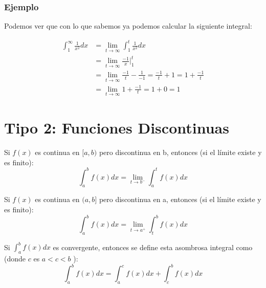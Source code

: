 \documentclass[12pt, fleqn]{report}                             %
\theoremstyle{break}                                            %
\begin{document}
            \subsubsection{Ejemplo}
            Podemos ver que con lo que sabemos ya podemos calcular la siguiente integral:

            \begin{equation*}
            \begin{split}
                \int_1^{\infty} \frac{1}{x^2} dx & = \lim_{t \to \infty} \int_1^t \frac{1}{x^2} dx \\
                & = \lim_{t \to \infty} \frac{-1}{x} \big\rvert_{1}^{t} \\
                & = \lim_{t \to \infty} \frac{-1}{t} - \frac{1}{-1} = \frac{-1}{t} + 1 = 1 + \frac{-1}{t} \\
                & = \lim_{t \to \infty} 1 + \frac{-1}{t} = 1 + 0 = 1
            \end{split}
            \end{equation*}

            \clearpage

        \clearpage
        \section{Tipo 2: Funciones Discontinuas}

            Si $f(x)$ es continua en $[a, b)$  pero discontinua en b, entonces
            (si el límite existe y es finito):
            \begin{equation}
                \int_a^b f(x) dx = \lim_{t \to b^-} \int_a^t f(x) dx
            \end{equation}

            Si $f(x)$ es continua en $(a, b]$  pero discontinua en a, entonces
            (si el límite existe y es finito):
            \begin{equation}
                \int_a^b f(x) dx = \lim_{t \to a^+} \int_t^b f(x) dx
            \end{equation}



            Si $\int_a^bf(x)dx$ es convergente, entonces se define esta asombrosa integral
            como (donde $c$ es $a<c<b$ ):
            \begin{equation}
                \int_a^b f(x) dx = \int_a^c f(x) dx + \int_c^b f(x) dx  
            \end{equation}
\end{document}
